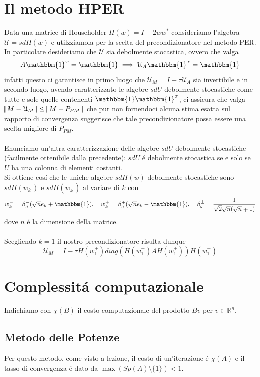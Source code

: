 \documentclass[12pt,a4paper]{amsart}
\numberwithin{equation}{section}
\theoremstyle{plain}
\theoremstyle{definition}
\newcommand{\tr}{^{\mathsmaller T}}
\newcommand{\ones}{\mathbbm{1}}
\begin{document}
\section{Il metodo HPER}
Data una matrice di Householder $H(w)=I-2ww^*$ consideriamo l'algebra $\mathcal{U}=sdH(w)$ e utilzziamola per la scelta del precondizionatore nel metodo PER.\\
In particolare desideriamo che $\mathcal{U}$ sia debolmente stocastica, ovvero che valga
\begin{equation}
A\ones\tr=\ones \implies \mathcal{U}_A\ones\tr=\ones
\end{equation}
infatti questo ci garantisce in primo luogo che $\mathcal{U}_M=I-\tau\mathcal{U}_A$ sia invertibile e in secondo luogo, avendo caratterizzato le algebre $sdU$ debolmente stocastiche come tutte e sole quelle contenenti $\ones\ones\tr$, ci assicura che valga $ \norm{M-\mathcal{U}_M}\leq\norm{M-P_{PM}}$ che pur non fornendoci alcuna stima esatta sul rapporto di convergenza suggerisce che tale precondizionatore possa essere una scelta migliore di $P_{PM}$.\\
\\
Enunciamo un'altra caratterizzazione delle algebre $sdU$ debolmente stocastiche (facilmente ottenibile dalla precedente): $sdU$ \'e debolmente stocastica se e solo se $U$ ha una colonna di elementi costanti.\\
Si ottiene cos\'i che le uniche algebre $sdH(w)$ debolmente stocastiche sono $sdH(w_k^-)$ e $sdH(w_k^+)$ al variare di $k$ con
\begin{equation}
w_k^-= \beta_n^-(\sqrt{n}e_k+\ones), \quad w_k^+= \beta_n^+(\sqrt{n}e_k-\ones), \quad \beta_b^\pm=\frac{1}{\sqrt{2}\sqrt{n}(\sqrt{n}\mp1)}
\end{equation}
dove $n$ \'e la dimensione della matrice.\\
\\
Scegliendo $k=1$ il nostro precondizionatore risulta dunque
\begin{equation}
\mathcal{U}_M=I-\tau H(w_1^+)diag(H(w_1^+)AH(w_1^+)) H(w_1^+)
\end{equation}

\section{Complessit\'a computazionale}
Indichiamo con $\chi(B)$ il costo computazionale del prodotto $Bv$ per $v \in \mathbb{R}^n$.\\
\subsection{Metodo delle Potenze}
Per questo metodo, come visto a lezione, il costo di un'iterazione \'e $\chi(A)$ e il tasso di convergenza \'e dato da $\max(Sp(A)\setminus \{1\})<1$.
\end{document}
